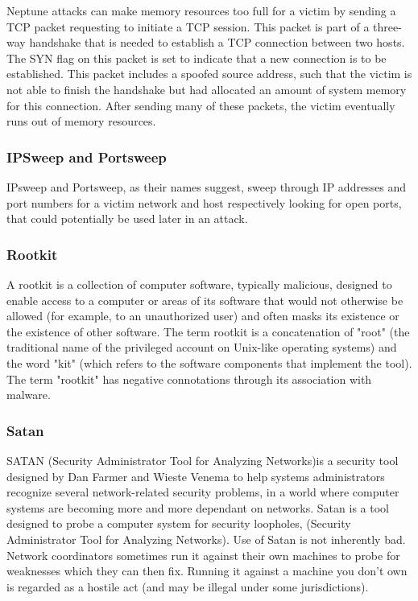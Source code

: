 \documentclass[12pt]{article}
\theoremstyle{definition}
\begin{document}
			Neptune attacks can make memory resources too
			full for a victim by sending a TCP packet requesting  to  initiate a TCP session. This  packet is part of a three-way handshake that is needed to establish a TCP connection between  two  hosts. The SYN flag on this packet is set  to  indicate that a new connection is  to  be  established. This packet includes  a spoofed  source  address, such that the victim is not able to finish the handshake but  had allocated  an  amount of system memory for this connection. After sending many of these packets, the victim eventually runs out of memory resources.
			
			\subsubsection{IPSweep and Portsweep}
			IPsweep  and  Portsweep,  as  their  names  suggest, sweep through IP addresses and port numbers for a  victim  network  and  host  respectively looking for open ports, that could  potentially be used later in an attack.
			
			\subsubsection{Rootkit}
			A rootkit is a collection of computer software, typically malicious, designed to enable access to a computer or areas of its software that would not otherwise be allowed (for example, to an unauthorized user) and often masks its existence or the existence of other software. The term rootkit is a concatenation of "root" (the traditional name of the privileged account on Unix-like operating systems) and the word "kit" (which refers to the software components that implement the tool). The term "rootkit" has negative connotations through its association with malware.
			
			\subsubsection{Satan}
			SATAN (Security Administrator Tool for Analyzing Networks)is a security tool designed by Dan Farmer and Wieste Venema to help systems administrators recognize several network-related security problems, in a world where computer systems are becoming more and more dependant on networks. Satan is a tool designed to probe a computer system for security loopholes, (Security Administrator Tool for Analyzing Networks). Use of Satan is not inherently bad. Network coordinators sometimes run it against their own machines to probe for weaknesses which they can then fix. Running it against a machine you don't own is regarded as a hostile act (and may be illegal under some jurisdictions).
			
\end{document}
